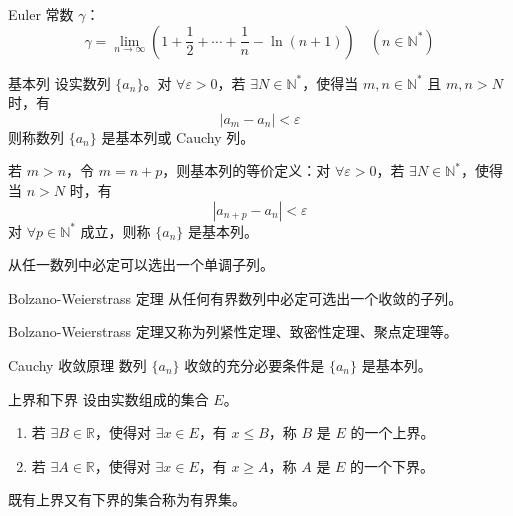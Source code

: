 \hfill

\begin{example}
    Euler 常数 $\gamma$：
    \[\gamma = \lim_{n \to \infty}\left( 1 + \frac{1}{2} + \cdots + \frac{1}{n} - \ln(n + 1) \right)\quad (n \in \mathbb{N}^{*})\]
\end{example}

\begin{definition}{基本列}
    设实数列 $\{a_n\}$。对 $\forall \varepsilon > 0$，若 $\exists N \in \mathbb{N}^{*}$，使得当 $m, n \in \mathbb{N}^{*}$ 且 $m, n > N$ 时，有
    \[|a_m - a_n| < \varepsilon\]
    则称数列 $\{a_n\}$ 是基本列或 Cauchy 列。

    若 $m > n$，令 $m = n + p$，则基本列的等价定义：对 $\forall \varepsilon > 0$，若 $\exists N \in \mathbb{N}^{*}$，使得当 $n > N$ 时，有
    \[|a_{n + p} - a_{n}| < \varepsilon\]
    对 $\forall p \in \mathbb{N}^{*}$ 成立，则称 $\{a_n\}$ 是基本列。
\end{definition}

\begin{lemma}
    从任一数列中必定可以选出一个单调子列。
\end{lemma}

\begin{theorem}{Bolzano-Weierstrass 定理}
    从任何有界数列中必定可选出一个收敛的子列。
\end{theorem}

\begin{remark}
    Bolzano-Weierstrass 定理又称为列紧性定理、致密性定理、聚点定理等。
\end{remark}

\begin{theorem}{Cauchy 收敛原理}
    数列 $\{a_n\}$ 收敛的充分必要条件是 $\{a_n\}$ 是基本列。
\end{theorem}

\begin{definition}{上界和下界}
    设由实数组成的集合 $E$。
    \begin{enumerate}
        \item 若 $\exists B \in \mathbb{R}$，使得对 $\exists x \in E$，有 $x \leqslant B$，称 $B$ 是 $E$ 的一个上界。
        \item 若 $\exists A \in \mathbb{R}$，使得对 $\exists x \in E$，有 $x \geqslant A$，称 $A$ 是 $E$ 的一个下界。
    \end{enumerate}
    既有上界又有下界的集合称为有界集。
\end{definition}

